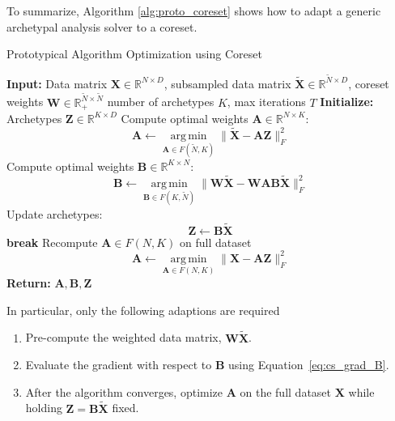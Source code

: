 \documentclass[oneside]{article}
\begin{document}
To summarize, Algorithm \ref{alg:proto_coreset} shows how to adapt a generic archetypal analysis solver to a coreset.

\begin{algorithm}[H]
    \caption{Prototypical Algorithm Optimization using Coreset}
    \label{alg:proto_coreset}
    \begin{algorithmic}[1]
    \State \textbf{Input:} Data matrix $\mathbf{X} \in \mathbb{R}^{N \times D}$, subsampled data matrix $\tilde{\mathbf{X}} \in \mathbb{R}^{\tilde{N} \times D}$, coreset weights $\mathbf{W} \in \mathbb{R}_+^{\tilde{N} \times \tilde{N}}$ number of archetypes $K$, max iterations $T$
    \State \textbf{Initialize:} Archetypes $\mathbf{Z} \in \mathbb{R}^{K \times D}$
        \State Compute optimal weights $\mathbf{A} \in \mathbb{R}^{N \times K}$:
        \begin{equation}
        \mathbf{A} \gets \operatorname*{arg\,min}_{\mathbf{A} \in F(\tilde{N}, K)} \| \tilde{\mathbf{X}} - {\mathbf{A}} \mathbf{Z} \|_F^2
        \end{equation}
        \State Compute optimal weights $\mathbf{B} \in \mathbb{R}^{K \times N}$:
        \begin{equation}
        \mathbf{B} \gets \operatorname*{arg\,min}_{\mathbf{B} \in F(K, \tilde{N})} \| \mathbf{W} \tilde{\mathbf{X}} - \mathbf{W} \mathbf{A} \mathbf{B} \tilde{\mathbf{X}} \|_F^2
        \end{equation}
        \State Update archetypes:
        \begin{equation}
        \mathbf{Z} \gets \mathbf{B} \tilde{\mathbf{X}}
        \end{equation}
            \State \textbf{break}
        \EndIf
    \EndFor
    \State Recompute $\mathbf{A} \in F(N, K)$ on full dataset
    \begin{equation}
    \mathbf{A} \gets \operatorname*{arg\,min}_{\mathbf{A} \in F(N, K)} \| \mathbf{X} - {\mathbf{A}} \mathbf{Z} \|_F^2
    \end{equation}
    \State \textbf{Return:} $\mathbf{A}, \mathbf{B}, \mathbf{Z}$
    \end{algorithmic}
\end{algorithm}

In particular, only the following adaptions are required

\begin{enumerate}
    \item Pre-compute the weighted data matrix, $\mathbf{W} \tilde{\mathbf{X}}$.
    \item Evaluate the gradient with respect to $\mathbf{B}$ using Equation~\eqref{eq:cs_grad_B}.
    \item After the algorithm converges, optimize $\mathbf{A}$ on the full dataset $\mathbf{X}$ while holding $\mathbf{Z}=\mathbf{B} \tilde{\mathbf{X}}$ fixed.
\end{enumerate}
\end{document}
